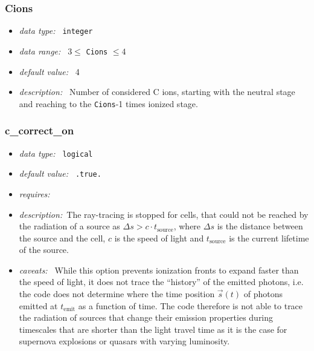 \documentclass[a4paper,10pt]{article}
\begin{document}
\subsubsection{Cions}
\label{opt:cions}
\begin{itemize}
 \item \textit{data type:~} \texttt{integer}
 \item \textit{data range:~}  $3 \leq$ \texttt{Cions} $\leq 4$ 
 \item \textit{default value:~} 4
 \item \textit{description:~} Number of considered C ions, starting with the 
 neutral stage and reaching to  the \texttt{Cions}-1 times ionized stage.
\end{itemize}


\subsubsection{c\_correct\_on}
\label{opt:ccorrecton}
\begin{itemize}
 \item \textit{data type:~} \texttt{logical}
 \item \textit{default value:~} \texttt{.true.}
 \item \textit{requires:~}
 \item \textit{description:~}The ray-tracing is stopped for cells, that could
  not be reached by the radiation of a source as 	
  $\Delta s > c \cdot t_\mathrm{source}$, where
  $\Delta s$ is the distance between the source and the cell, $c$ is the speed 
  of light and $t_\mathrm{source}$ is the current lifetime of the source.
 \item \textit{caveats:~} While this option prevents ionization fronts to expand
  faster than the speed of light, it does not trace the ``history'' of the 
  emitted photons, i.e. the code does not determine where the time position $ 
  \vec{s}(t)$ of photons emitted at  $t_\mathrm{emit}$ as a function of time. 
  The code therefore is not able to trace the radiation 
  of sources that change their emission properties during timescales that are 
  shorter than the light travel time as it is the  case for supernova 
  explosions  or quasars with varying luminosity.   
\end{itemize}
\end{document}

